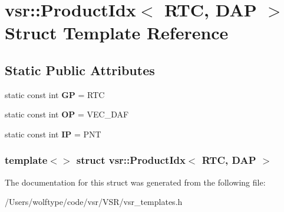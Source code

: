 \hypertarget{structvsr_1_1_product_idx_3_01_r_t_c_00_01_d_a_p_01_4}{\section{vsr\-:\-:Product\-Idx$<$ R\-T\-C, D\-A\-P $>$ Struct Template Reference}
\label{structvsr_1_1_product_idx_3_01_r_t_c_00_01_d_a_p_01_4}
}
\subsection*{Static Public Attributes}
\begin{DoxyCompactItemize}
\item 
\hypertarget{structvsr_1_1_product_idx_3_01_r_t_c_00_01_d_a_p_01_4_a08a08c2f783ac8ea50be62e9cd33aaae}{static const int {\bfseries G\-P} = R\-T\-C}\label{structvsr_1_1_product_idx_3_01_r_t_c_00_01_d_a_p_01_4_a08a08c2f783ac8ea50be62e9cd33aaae}

\item 
\hypertarget{structvsr_1_1_product_idx_3_01_r_t_c_00_01_d_a_p_01_4_a45ebfa3389f7d329a8569c0f5bf4e3aa}{static const int {\bfseries O\-P} = V\-E\-C\-\_\-\-D\-A\-F}\label{structvsr_1_1_product_idx_3_01_r_t_c_00_01_d_a_p_01_4_a45ebfa3389f7d329a8569c0f5bf4e3aa}

\item 
\hypertarget{structvsr_1_1_product_idx_3_01_r_t_c_00_01_d_a_p_01_4_aea497c740c157885512fca6fa952a06c}{static const int {\bfseries I\-P} = P\-N\-T}\label{structvsr_1_1_product_idx_3_01_r_t_c_00_01_d_a_p_01_4_aea497c740c157885512fca6fa952a06c}

\end{DoxyCompactItemize}
\subsubsection*{template$<$$>$ struct vsr\-::\-Product\-Idx$<$ R\-T\-C, D\-A\-P $>$}



The documentation for this struct was generated from the following file\-:\begin{DoxyCompactItemize}
\item 
/\-Users/wolftype/code/vsr/\-V\-S\-R/vsr\-\_\-templates.\-h\end{DoxyCompactItemize}
